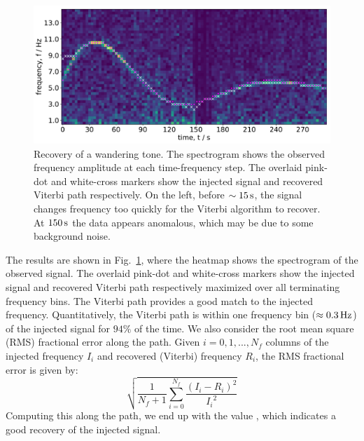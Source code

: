 \documentclass[paper-main.tex]{subfiles}
\begin{document}
\begin{figure}
	\includegraphics[width=\textwidth]{figures/expt_overlay_2_viterbi_test_webcam.pdf}
	\caption{\label{fig:viterbi_overlay}
Recovery of a wandering tone. 
The spectrogram shows the observed frequency amplitude at each time-frequency step. 
The overlaid pink-dot and white-cross markers show the injected signal and recovered Viterbi path respectively. 
On the left, before $\sim 15\,{\rm s}$, the signal changes frequency too quickly for the Viterbi algorithm to recover. 
At $150\,{\rm s}$ the data appears anomalous, which may be due to some background noise. }
\end{figure}


The results are shown in Fig.~\ref{fig:viterbi_overlay}, where the heatmap shows the spectrogram of the observed signal. 
The overlaid pink-dot and white-cross markers show the injected signal and recovered Viterbi path respectively maximized over all terminating frequency bins. 
The Viterbi path provides a good match to the injected frequency. 
Quantitatively, the Viterbi path is within one frequency bin ($\approx 0.3\,{\rm Hz}$) of the injected signal for $94\%$ of the time. 
We also consider the root mean square (RMS) fractional error along the path. Given $i=0,1,...,N_f$ columns of the injected frequency $I_i$ and recovered (Viterbi) frequency $R_i$, the RMS fractional error is given by:
\begin{equation}
\sqrt{ \frac{1}{N_f+1} \sum_{i=0}^{N_f} \frac{(I_i - R_i)^2}{{I_i}^2} }
\end{equation}
Computing this along the path, we end up with the value , which indicates a good recovery of the injected signal.
\end{document}
